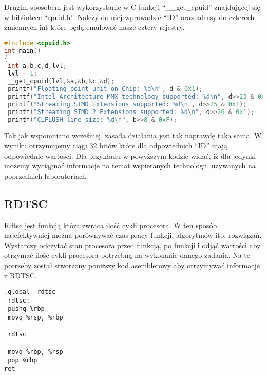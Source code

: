 Drugim sposobem jest wykorzystanie w C funkcji "`\_\_get\_cpuid"' znajdującej się w bibliotece "`cpuid.h"'. Należy do niej wprowadzić "`ID"' oraz adresy do czterech zmiennych int które będą emulować nasze cztery rejestry.
\begin{lstlisting}[language=C, frame=single, caption=Funkcja odczytująca i weryfikująca cpuid, label=l:vertical, basicstyle=\small]  
#include <cpuid.h>
int main()
{
 int a,b,c,d,lvl;
 lvl = 1;
 __get_cpuid(lvl,&a,&b,&c,&d);
 printf("Floating-point unit on-Chip: %d\n", d & 0x1);
 printf("Intel Architecture MMX technology supported: %d\n", d>>23 & 0x1);
 printf("Streaming SIMD Extensions supported: %d\n", d>>25 & 0x1);
 printf("Streaming SIMD 2 Extensions supported: %d\n", d>>26 & 0x1);
 printf("CLFLUSH line size: %d\n", b>>8 & 0xF);
\end{lstlisting}
Tak jak wspomniano wcześniej, zasada działania jest tak naprawdę taka sama. W wyniku otrzymujemy ciągi 32 bitów które dla odpowiednich "`ID"' mają odpowiednie wartości. Dla przykładu w powyższym kodzie widać, iż dla jedynki możemy wyciągnąć informacje na temat wspieranych technologii, używanych na poprzednich laboratoriach.

\subsection{RDTSC}
Rdtsc jest funkcją która zwraca ilość cykli procesora. W ten sposób najefektywniej można porównywać czas pracy funkcji, algorytmów itp. rozwiązań. Wystarczy odczytać stan procesora przed funkcją, po funkcji i odjąć wartości aby otrzymać ilość cykli procesora potrzebną na wykonanie danego zadania. Na te potrzeby został stworzony poniższy kod asemblerowy aby otrzymywać informacje z RDTSC.
\begin{lstlisting}[frame=single, basicstyle=\small, caption=Funkcja RDTSC]
.global _rdtsc
_rdtsc:
 pushq %rbp
 movq %rsp, %rbp

 rdtsc

 movq %rbp, %rsp
 pop %rbp
ret
\end{lstlisting}

